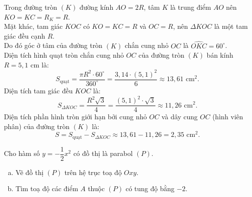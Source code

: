 \begin{bt}
{\begin{enumerate}[a)]
	Trong đường tròn $(K)$ đường kính $AO = 2R$, tâm $K$ là trung điểm $AO$ nên $KO = KC = R_K = R$.\\
	Mặt khác, tam giác $KOC$ có $KO = KC = R$ và $OC = R$, nên $\Delta KOC$ là một tam giác đều cạnh $R$.\\
	Do đó góc ở tâm của đường tròn $(K)$ chắn cung nhỏ $OC$ là $\widehat{OKC} = 60^\circ$.\\
	Diện tích hình quạt tròn chắn cung nhỏ $OC$ của đường tròn $(K)$ bán kính $R = 5{,}1\text{ cm}$ là:
	$$ S_{\text{quạt}} = \dfrac{\pi R^2 \cdot 60^\circ}{360^\circ} = \dfrac{3{,}14 \cdot (5{,}1)^2}{6} \approx 13{,}61\text{ cm}^2. $$
	Diện tích tam giác đều $KOC$ là:
	$$ S_{\Delta KOC} = \dfrac{R^2\sqrt{3}}{4} = \dfrac{(5{,}1)^2 \cdot \sqrt{3}}{4} \approx 11{,}26\text{ cm}^2. $$
	Diện tích phần hình tròn giới hạn bởi cung nhỏ $OC$ và dây cung $OC$ (hình viên phân) của đường tròn $(K)$ là:
	$$ S = S_{\text{quạt}} - S_{\Delta KOC} \approx 13{,}61 - 11{,}26 = 2{,}35\text{ cm}^2. $$
\end{enumerate}
}
\end{bt}

\begin{bt}%
Cho hàm số $y=-\dfrac{1}{2}x^2$ có đồ thị là parabol $(P)$.
\begin{enumerate}[a)]
	\item Vẽ đồ thị $(P)$ trên hệ trục toạ độ $Oxy$.
	\item Tìm toạ độ các điểm $A$ thuộc $(P)$ có tung độ bằng $-2$.
\end{enumerate}
\end{bt}

